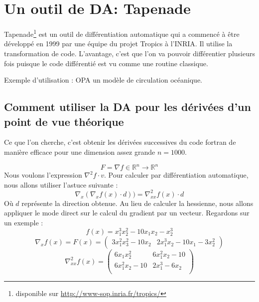 


\section{Un outil de DA: Tapenade}
\label{sec:tapenade}


Tapenade\footnote{disponible sur \url{http://www-sop.inria.fr/tropics/}} est un outil de diff\'erentiation automatique qui a commenc\'e \`a être d\'evelopp\'e en 1999
par une \'equipe du projet Tropics \`a l'INRIA. 
 Il utilise la transformation de code. L'avantage, c'est que l'on va pouvoir diff\'erentier plusieurs fois
puisque le code diff\'erenti\'e est vu comme une routine classique.

Exemple d'utilisation : \cite{diffautoopa} OPA un mod\`ele de circulation oc\'eanique.


    \subsection{Comment utiliser la DA pour les d\'eriv\'ees d'un point de vue th\'eorique}

Ce que l'on cherche, c'est obtenir les d\'eriv\'ees successives du code fortran de mani\`ere efficace pour 
une dimension assez grande $n=1000$.

$$F=\nabla f \in \mathbb{R}^n \rightarrow \mathbb{R}^n$$
Nous voulons l'expression $\nabla^2 f\cdot v$. Pour calculer par diff\'erentiation automatique, nous allons utiliser l'astuce 
suivante :
$$\nabla_x(\nabla_x f(x) \cdot d)) = \nabla_{xx}^2f(x) \cdot d$$ O\`u $d$ repr\'esente la direction obtenue.
Au lieu de calculer la hessienne, nous allons appliquer le mode direct sur le calcul du gradient par un vecteur.
Regardons sur un exemple : 
$$f(x)=x_1^3x_2^2-10x_1x_2-x_2^3$$
$$\nabla_x f(x)=F(x)=\left( \begin{array}{cc}3x_1^2x_3^2-10x_2 & 2x_1^3x_2-10x_1-3x_2^2\end{array} \right)$$
$$\nabla_{xx}^2f(x)=\left( \begin{array}{cc}
6x_1x_2^2 & 6x_1^2x_2-10 \\
6x_1^2x_2-10 &  2x_1^3-6x_2 \\
\end{array} \right)$$

